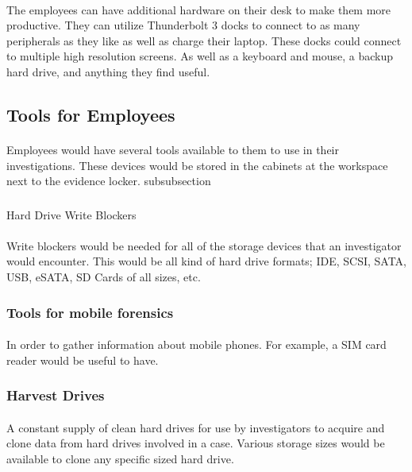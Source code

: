 \documentclass{article}
\begin{document}
\paragraph{}
The employees can have additional hardware on their desk to make them more productive.
They can utilize Thunderbolt 3 docks to connect to as many peripherals as they like as well as charge their laptop.
These docks could connect to multiple high resolution screens. As well as a keyboard and mouse, a backup hard drive, and anything they find useful.

 
\subsection{Tools for Employees} 
\paragraph{}
Employees would have several tools available to them to use in their investigations.
These devices would be stored in the cabinets at the workspace next to the evidence locker.
subsubsection
\subsubsection{}
Hard Drive Write Blockers
\paragraph{}
Write blockers would be needed for all of the storage devices that an investigator would encounter.
This would be all kind of hard drive formats; IDE, SCSI, SATA, USB, eSATA, SD Cards of all sizes, etc.
\subsubsection{Tools for mobile forensics}
\paragraph{}
In order to gather information about mobile phones. For example, a SIM card reader would be useful to have.
\subsubsection{Harvest Drives}
\paragraph{}
A constant supply of clean hard drives for use by investigators to acquire and clone data from hard drives involved in a case.
Various storage sizes would be available to clone any specific sized hard drive.
\end{document}
